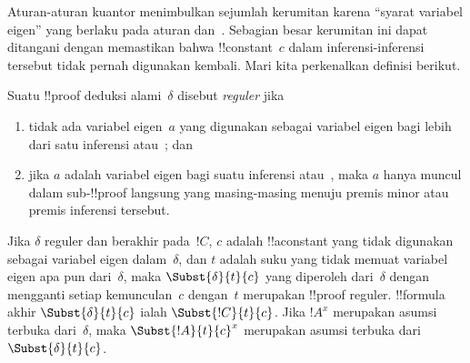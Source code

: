 \documentclass[../../../include/open-logic-section]{subfiles}
\begin{document}


Aturan-aturan kuantor menimbulkan sejumlah kerumitan karena
``syarat variabel eigen'' yang berlaku pada aturan
\Elim{\lexists} dan~\Intro{\lforall}. Sebagian besar kerumitan ini
dapat ditangani dengan memastikan bahwa !!{constant}~$c$ dalam
inferensi-inferensi tersebut tidak pernah digunakan kembali. Mari kita
perkenalkan definisi berikut.

\begin{defn}
Suatu !!{proof} deduksi alami~$\delta$ disebut \emph{reguler} jika
\begin{enumerate}
  \item tidak ada variabel eigen~$a$ yang digunakan sebagai variabel eigen
  bagi lebih dari satu inferensi \Elim{\lexists}
  atau~\Intro{\lforall}; dan
  \item jika $a$ adalah variabel eigen bagi suatu inferensi
  \Elim{\lexists} atau~\Intro{\lforall}, maka $a$ hanya muncul dalam
  sub-!!{proof} langsung yang masing-masing menuju premis minor atau
  premis inferensi tersebut.
\end{enumerate}
\end{defn}

\begin{lem}
Jika $\delta$ reguler dan berakhir pada~$!C$, $c$ adalah
!!a{constant} yang tidak digunakan sebagai variabel eigen
dalam~$\delta$, dan $t$ adalah suku yang tidak memuat variabel eigen
apa pun dari~$\delta$, maka $\Subst{\delta}{t}{c}$ yang diperoleh
dari~$\delta$ dengan mengganti setiap kemunculan~$c$ dengan~$t$
merupakan !!{proof} reguler. !!{formula} akhir
$\Subst{\delta}{t}{c}$ ialah $\Subst{!C}{t}{c}$. Jika $!A^x$
merupakan asumsi terbuka dari~$\delta$, maka
$\Subst{!A}{t}{c}^x$ merupakan asumsi terbuka dari
$\Subst{\delta}{t}{c}$.
\end{lem}
\end{document}
